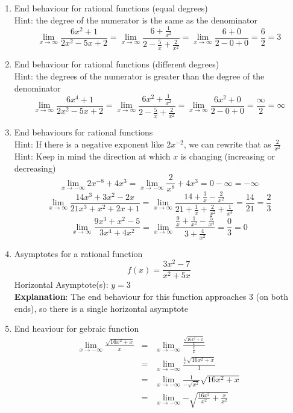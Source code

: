\documentclass{article}
\begin{document}
\begin{enumerate}
	\item End behaviour for rational functions (equal degrees)
		\\ Hint: the degree of the numerator is the same as the denominator
		$$\lim_{x \to \infty}{\frac{6x^2 + 1}{2x^2 - 5x + 2}} = \lim_{x \to \infty}{\frac{6 + \frac{1}{x^2}}{2 - \frac{5}{x} + \frac{2}{x^2}}} = \lim_{x \to \infty}{\frac{6 + 0}{2 - 0 + 0}} = \frac{6}{2} = 3$$
	\item End behaviour for rational functions (different degrees)
		\\ Hint: the degrees of the numerator is greater than the degree of the denominator
		$$\lim_{x \to \infty}{\frac{6x^4 + 1}{2x^2 - 5x + 2}} = \lim_{x \to \infty}{\frac{6x^2 + \frac{1}{x^2}}{2 - \frac{5}{x} + \frac{2}{x^2}}} = \lim_{x \to \infty}{\frac{6x^2 + 0}{2 - 0 + 0}} = \frac{\infty}{2} = \infty$$
	\item End behaviours for rational functions
		\\ Hint: If there is a negative exponent like $2x^{-2}$, we can rewrite that as $\frac{2}{x^2}$
		\\ Hint: Keep in mind the direction at which $x$ is changing (increasing or decreasing)
		$$\lim_{x \to - \infty}{2x^{-8} + 4x^3} = \lim_{x \to - \infty}{\frac{2}{x^8} + 4x^3} = 0 - \infty = - \infty$$
		$$\lim_{x \to \infty}{\frac{14x^3 + 3x^2 - 2x}{21x^3 + x^2 + 2x + 1}} = \lim_{x \to \infty}{\frac{14 + \frac{3}{x} - \frac{2}{x^2}}{21 + \frac{1}{x} + \frac{2}{x^2} + \frac{1}{x^3}}} = \frac{14}{21} = \frac{2}{3}$$
		$$\lim_{x \to \infty}{\frac{9x^3 + x^2 - 5}{3x^4 + 4x^2}} = \lim_{x \to \infty}{\frac{\frac{9}{x} + \frac{1}{x^2} - \frac{5}{x^4}}{3 + \frac{4}{x^2}}} = \frac{0}{3} = 0$$
	\item Asymptotes for a rational function
		$$f(x) = \frac{3x^2 - 7}{x^2 + 5x}$$
		Horizontal Asymptote(s): $y = 3$
		\\ \textbf{Explanation}: The end behaviour for this function approaches $3$ (on both ends), so there is a single horizontal asymptote
	\item End heaviour for gebraic function
		\begin{eqnarray}
			\lim_{x \to - \infty}{\frac{\sqrt{16x^2 + x}}{x}} &=& \lim_{x \to - \infty}{\frac{\frac{\sqrt{16x^2 + x}}{x}}{\frac{x}{x}}} \\
			&=& \lim_{x \to - \infty}{\frac{\frac{1}{x}\sqrt{16x^2 + x}}{1}} \\
			&=& \lim_{x \to - \infty}{\frac{1}{-\sqrt{x^2}}\sqrt{16x^2 + x}} \\
			&=& \lim_{x \to - \infty}{- \sqrt{\frac{16x^2}{x^2} + \frac{x}{x^2}}} \\

\end{eqnarray}
\end{enumerate}
\end{document}
